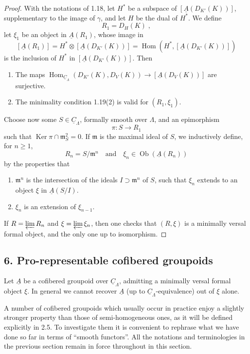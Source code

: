 \documentclass[11pt]{article}
\theoremstyle{plain}
\theoremstyle{definition}
\theoremstyle{remark}
\DeclareMathOperator{\Hom}{Hom}
\DeclareMathOperator{\Ker}{Ker}
\DeclareMathOperator{\Ob}{Ob}
\newcommand{\uA}{\underline{A}}\newcommand{\uH}{\underline{H}}\newcommand{\uExt}{\underline{\operatorname{Ext}}}\newcommand{\uL}{\underline{L}}\newcommand{\uM}{\underline{M}}\newcommand{\uZ}{\underline{Z}}\newcommand{\uB}{\underline{B}}\newcommand{\uC}{\underline{C}}\newcommand{\uD}{\underline{D}}\newcommand{\uE}{\underline{E}}\newcommand{\uG}{\underline{G}}\newcommand{\uP}{\underline{P}}\newcommand{\uQ}{\underline{Q}}
\newcommand{\fm}{\mathfrak m}
\begin{document}
\begin{proof}
With the notations of 1.18, let $H^*$ be a subspace of $[\uA(D_{K'}(K))]$, supplementary to the image of $\gamma$, and let $H$ be the dual of $H^*$. We define
\[
R_1 = D_H(K)\;,
\]
let $\xi_1$ be an object in $\uA(R_1)$, whose image in
\[
[\uA(R_1)] = H^* \otimes [\uA(D_{K'}(K))] = \Hom(H^*, [\uA(D_{K'}(K))])
\]
is the inclusion of $H^*$ in $[\uA(D_{K'}(K))]$. Then
\begin{enumerate}
\item[(1)] The maps $\Hom_{\underline{C}_{\Lambda}}(D_{K'}(K), D_V(K)) \longrightarrow [\uA(D_V(K))]$ are surjective.
\item[(2)] The minimality condition 1.19(2) is valid for $(R_1, \xi_1)$.
\end{enumerate}

Choose now some $S \in \underline{C}_{\Lambda}$, formally smooth over $\Lambda$, and an epimorphism
\[
\pi : S \to R_1
\]
such that $\Ker \pi \cap \fm_S^2 = 0$. If $\fm$ is the maximal ideal of $S$, we inductively define, for $n \geq 1$,
\[
R_n = S/\fm^n \quad \text{and} \quad \xi_n \in \Ob(\uA(R_n))
\]
by the properties that
\begin{enumerate}
\item[(a)] $\fm^n$ is the intersection of the ideals $I \supset \fm^n$ of $S$, such that $\xi_n$ extends to an object $\xi$ in $\uA(S/I)$.
\item[(b)] $\xi_n$ is an extension of $\xi_{n-1}$.
\end{enumerate}
If $R = \varprojlim R_n$ and $\xi = \varprojlim \xi_n$, then one checks that $(R, \xi)$ is a minimally versal formal object, and the only one up to isomorphism.
\end{proof}

\subsection*{6. Pro-representable cofibered groupoids}

Let $\uA$ be a cofibered groupoid over $\underline{C}_{\Lambda}$, admitting a minimally versal formal object $\xi$. In general we cannot recover $\uA$ (up to $\underline{C}_{\Lambda}$-equivalence) out of $\xi$ alone.

A number of cofibered groupoids which usually occur in practice enjoy a slightly stronger property than those of semi-homogeneous ones, as it will be defined explicitly in 2.5. To investigate them it is convenient to rephrase what we have done so far in terms of ``smooth functors''. All the notations and terminologies in the previous section remain in force throughout in this section.
\end{document}
